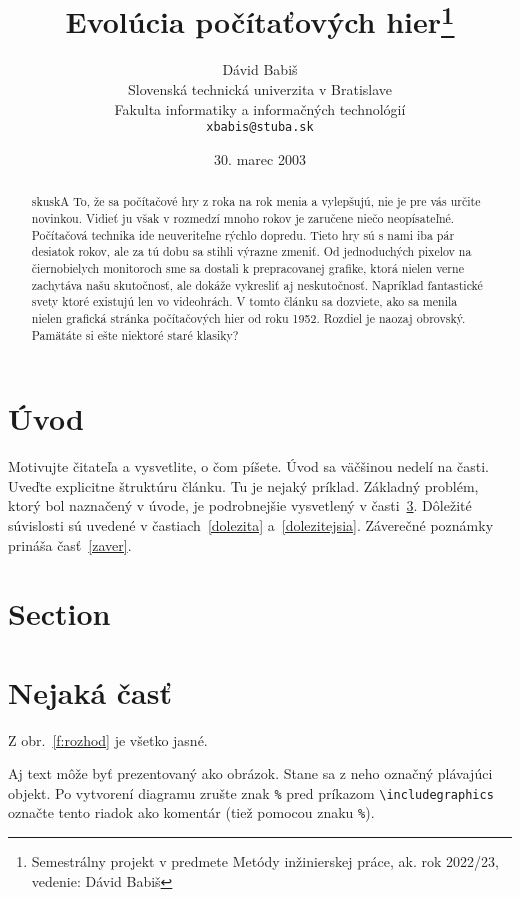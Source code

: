 \documentclass[10pt,twoside,slovak,a4paper]{coursepaper}
\title{Evolúcia počítaťových hier\thanks{Semestrálny projekt v predmete Metódy inžinierskej práce, ak. rok 2022/23, vedenie: Dávid Babiš}} %
\author{Dávid Babiš\\[2pt]
	{\small Slovenská technická univerzita v Bratislave}\\
	{\small Fakulta informatiky a informačných technológií}\\
	{\small \texttt{xbabis@stuba.sk}}
	}
\date{\small 30. marec 2003} %
\begin{document}
\maketitle

\begin{abstract}
skuskA
To, že sa počítačové hry z roka na rok menia a vylepšujú, nie je pre vás určite novinkou. Vidieť ju však v rozmedzí mnoho rokov je zaručene niečo neopísateľné. Počítačová technika ide neuveriteľne rýchlo dopredu. Tieto hry sú s nami iba pár desiatok rokov, ale za tú dobu sa stihli výrazne zmeniť. Od jednoduchých pixelov na čiernobielych monitoroch sme sa dostali k prepracovanej grafike, ktorá nielen verne zachytáva našu skutočnosť, ale dokáže vykresliť aj neskutočnosť. Napríklad fantastické svety ktoré existujú len vo videohrách.  V tomto článku sa dozviete, ako sa menila nielen grafická stránka počítačových hier od roku 1952. Rozdiel je naozaj obrovský. Pamätáte si ešte niektoré staré klasiky?
\end{abstract}



\section{Úvod}
Motivujte čitateľa a vysvetlite, o čom píšete. Úvod sa väčšinou nedelí na časti.
Uveďte explicitne štruktúru článku. Tu je nejaký príklad.
Základný problém, ktorý bol naznačený v úvode, je podrobnejšie vysvetlený v časti~\ref{nejaka}.
Dôležité súvislosti sú uvedené v častiach~\ref{dolezita} a~\ref{dolezitejsia}.
Záverečné poznámky prináša časť~\ref{zaver}.

\section{Section}

\section{Nejaká časť} \label{nejaka}

Z obr.~\ref{f:rozhod} je všetko jasné. 

\begin{figure*}[tbh]
\centering
Aj text môže byť prezentovaný ako obrázok. Stane sa z neho označný plávajúci objekt. Po vytvorení diagramu zrušte znak \texttt{\%} pred príkazom \verb|\includegraphics| označte tento riadok ako komentár (tiež pomocou znaku \texttt{\%}).
\caption{Rozhodujúci argument.}
\label{f:rozhod}
\end{figure*}
\end{document}
